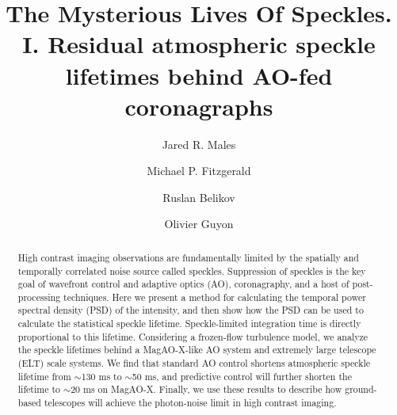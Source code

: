\documentclass[10pt,preprint]{aastex631}
\newcommand{\jrmrmv}[1]{\textcolor{blue}{\sout{#1}}}
\begin{document}
\title{The Mysterious Lives Of Speckles. I. Residual atmospheric speckle lifetimes behind AO-fed coronagraphs}

\author{Jared R. Males}

\author{Michael P. Fitzgerald}

\author{Ruslan Belikov}

\author{Olivier Guyon}

\begin{abstract}
High contrast imaging observations are fundamentally limited by the spatially and temporally correlated noise source called speckles.  Suppression of speckles is the key goal of wavefront control and adaptive optics (AO), coronagraphy, and a host of post-processing techniques.  Here we present a method for calculating the temporal power spectral density (PSD) of the intensity, and then show how the PSD can be used to calculate the statistical speckle lifetime.  Speckle-limited integration time is directly proportional to this lifetime.  Considering a frozen-flow turbulence model, we analyze the speckle lifetimes behind a MagAO-X-like AO system and extremely large telescope (ELT) scale systems.    We find that standard AO control shortens atmospheric speckle lifetime from $\sim$130 ms to $\sim$50 ms, and predictive control will further shorten the lifetime to $\sim$20 ms on MagAO-X.  Finally, we use these results to describe how ground-based telescopes will achieve the photon-noise limit in high contrast imaging.
\end{abstract}

\end{document}
